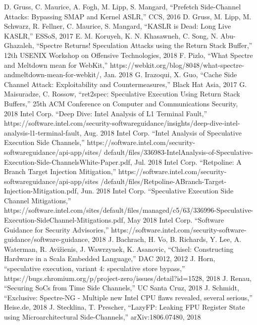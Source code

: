 \begin{thebibliography}{00}
     D. Gruss, C. Maurice, A. Fogh, M. Lipp, S. Mangard, ``Prefetch Side-Channel Attacks: Bypassing SMAP and Kernel ASLR,'' CCS, 2016
     D. Gruss, M. Lipp, M. Schwarz, R. Fellner, C. Maurice, S. Mangard, ``KASLR is Dead: Long Live KASLR,'' ESSoS, 2017
     E. M. Koruyeh, K. N. Khasawneh, C. Song, N. Abu-Ghazaleh, ``Spectre Returns! Speculation Attacks using the Return Stack Buffer,'' 12th USENIX Workshop on Offensive Technologies, 2018
     F. Pizlo, ``What Spectre and Meltdown mean for WebKit,'' https://webkit.org/blog/8048/what-spectre-andmeltdown-mean-for-webkit/, Jan. 2018
     G. Irazoqui, X. Guo, ``Cache Side Channel Attack: Exploitability and Countermeasures,'' Black Hat Asia, 2017
     G. Maisuradze, C. Rossow, ``ret2spec: Speculative Execution Using Return Stack Buffers,'' 25th ACM Conference on Computer and Communications Security, 2018
     Intel Corp. ``Deep Dive: Intel Analysis of L1 Terminal Fault,'' https://software.intel.com/security-softwareguidance/insights/deep-dive-intel-analysis-l1-terminal-fault, Aug. 2018
     Intel Corp. ``Intel Analysis of Speculative Execution Side Channels,'' https://software.intel.com/security-softwareguidance/api-app/sites/ default/files/336983-IntelAnalysis-of-Speculative-Execution-Side-ChannelsWhite-Paper.pdf, Jul. 2018
     Intel Corp. ``Retpoline: A Branch Target Injection Mitigation,'' https://software.intel.com/security-softwareguidance/api-app/sites /default/files/Retpoline-ABranch-Target-Injection-Mitigation.pdf, Jun. 2018
     Intel Corp. ``Speculative Execution Side Channel Mitigations,'' https://software.intel.com/sites/default/files/managed/c5/63/336996-Speculative-Execution-SideChannel-Mitigations.pdf, May 2018
     Intel Corp. ``Software Guidance for Security Advisories,'' https://software.intel.com/security-software-guidance/software-guidance, 2018
     J. Bachrach, H. Vo, B. Richards, Y. Lee, A. Waterman, R. Avižienis, J. Wawrzynek, K. Asanovic, ``Chisel: Constructing Hardware in a Scala Embedded Language,'' DAC 2012, 2012
     J. Horn, ``speculative execution, variant 4: speculative store bypass,'' https://bugs.chromium.org/p/project-zero/issues/detail?id=1528, 2018
     J. Renau, ``Securing SoCs from Time Side Channels,'' UC Santa Cruz, 2018
     J. Schmidt, ``Exclusive: Spectre-NG - Multiple new Intel CPU flaws revealed, several serious,'' Heise.de, 2018
     J. Stecklina, T. Prescher, ``LazyFP: Leaking FPU Register State using Microarchitectural Side-Channels,'' arXiv:1806.07480, 2018

\end{thebibliography}
